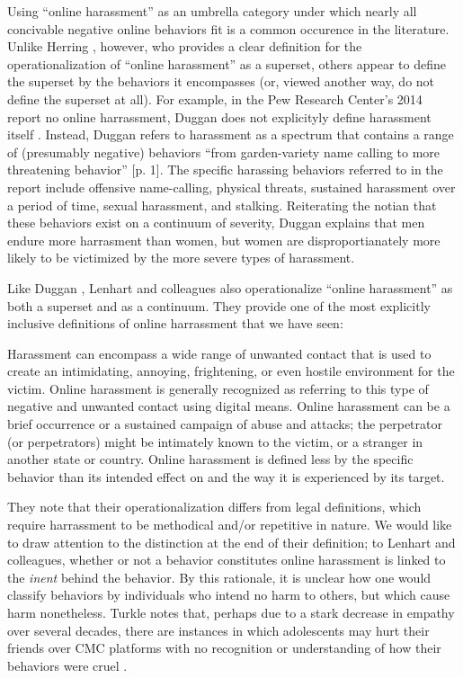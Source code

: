 \documentclass{sigchi}
\begin{document}
Using ``online harassment'' as an umbrella category under which nearly all concivable negative online behaviors fit is a common occurence in the literature.  Unlike Herring \cite{Herring1999Rhetorical}, however, who provides a clear definition for the operationalization of ``online harassment'' as a superset, others appear to define the superset by the behaviors it encompasses (or, viewed another way, do not define the superset at all).  For example, in the Pew Research Center's 2014 report no online harrassment, Duggan does not explicityly define harassment itself \cite{Duggan2014Online}.  Instead, Duggan refers to harassment as a spectrum that contains a range of (presumably negative) behaviors ``from garden-variety name calling to more threatening behavior'' [p. 1].  The specific harassing behaviors referred to in the report include offensive name-calling, physical threats, sustained harassment over a period of time, sexual harassment, and stalking.  Reiterating the notian that these behaviors exist on a continuum of severity, Duggan explains that men endure more harrasment than women, but women are disproportianately more likely to be victimized by the more severe types of harassment.

Like Duggan \cite{Duggan2014Online}, Lenhart and colleagues \cite{Lenhart2016Online} also operationalize ``online harassment'' as both a superset and as a continuum.  They provide one of the most explicitly inclusive definitions of online harrassment that we have seen:

\begin{displayquote}
Harassment can encompass a wide range of unwanted contact that is used to create an intimidating, annoying, frightening, or even hostile environment for the victim. Online harassment is generally recognized as referring to this type of negative and unwanted contact using digital means. Online harassment can be a brief occurrence or a sustained campaign of abuse and attacks; the perpetrator (or perpetrators) might be intimately known to the victim, or a stranger in another state or country. Online harassment is defined less by the specific behavior than its intended effect on and the way it is experienced by its target.
\end{displayquote}

They note that their operationalization differs from legal definitions, which require harrassment to be methodical and/or repetitive in nature.  We would like to draw attention to the distinction at the end of their definition; to Lenhart and colleagues, whether or not a behavior constitutes online harassment is linked to the \textit{inent} behind the behavior.  By this rationale, it is unclear how one would classify behaviors by individuals who intend no harm to others, but which cause harm nonetheless.  Turkle notes that, perhaps due to a stark decrease in empathy over several decades, there are instances in which adolescents may hurt their friends over CMC platforms with no recognition or understanding of how their behaviors were cruel \cite{Turkle2015Reclaiming}.  
\end{document}

